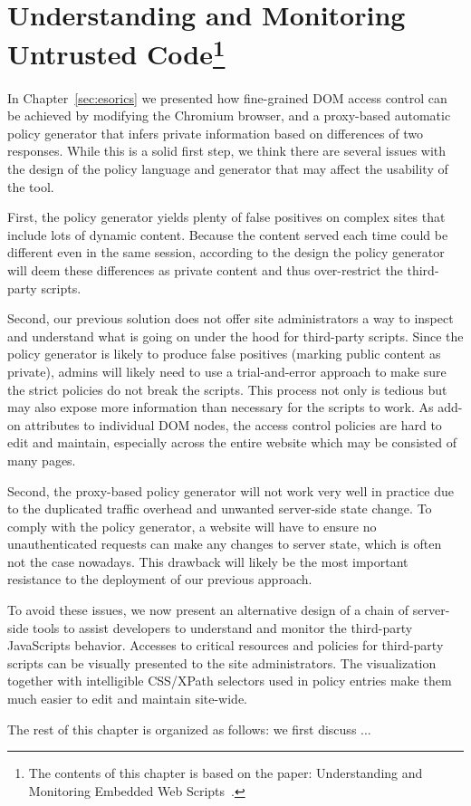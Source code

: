 \chapter[Understanding and Monitoring Untrusted Code]{Understanding and Monitoring Untrusted Code\footnote{The contents of this chapter is based on the paper: Understanding and Monitoring Embedded Web Scripts~\cite{FireInspector}.}}
\label{sec:fireinspector}

In Chapter~\ref{sec:esorics} we presented how fine-grained DOM access control can be achieved by modifying the Chromium browser, and a proxy-based automatic policy generator that infers private information based on differences of two responses.  While this is a solid first step, we think there are several issues with the design of the policy language and generator that may affect the usability of the tool.

First, the policy generator yields plenty of false positives on complex sites that include lots of dynamic content.  Because the content served each time could be different even in the same session, according to the design the policy generator will deem these differences as private content and thus over-restrict the third-party scripts.

Second, our previous solution does not offer site administrators a way to inspect and understand what is going on under the hood for third-party scripts.  Since the policy generator is likely to produce false positives (marking public content as private), admins will likely need to use a trial-and-error approach to make sure the strict policies do not break the scripts.  This process not only is tedious but may also expose more information than necessary for the scripts to work.  As add-on attributes to individual DOM nodes, the access control policies are hard to edit and maintain, especially across the entire website which may be consisted of many pages.  

Second, the proxy-based policy generator will not work very well in practice due to the duplicated traffic overhead and unwanted server-side state change.  To comply with the policy generator, a website will have to ensure no unauthenticated requests can make any changes to server state, which is often not the case nowadays.  This drawback will likely be the most important resistance to the deployment of our previous approach.

To avoid these issues, we now present an alternative design of a chain of server-side tools to assist developers to understand and monitor the third-party JavaScripts behavior.  Accesses to critical resources and policies for third-party scripts can be visually presented to the site administrators.  The visualization together with intelligible CSS/XPath selectors used in policy entries make them much easier to edit and maintain site-wide.

The rest of this chapter is organized as follows: we first discuss ...

